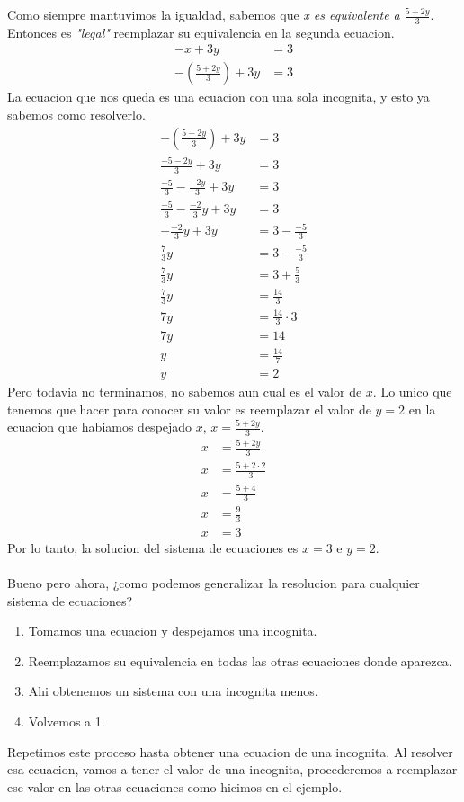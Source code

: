 \documentclass{article}
\begin{document}
\begin{normalsize}
Como siempre mantuvimos la igualdad, sabemos que \textit{x es equivalente a $\frac{5+2y}{3}$}. Entonces es \textit{"legal"} reemplazar su equivalencia en la segunda ecuacion.
	\begin{align}
	-x+3y&=3\nonumber\\
	-(\frac{5+2y}{3})+3y&=3\nonumber
	\end{align}
La ecuacion que nos queda es una ecuacion con una sola incognita, y esto ya sabemos como resolverlo.
	\begin{align}
	-(\frac{5+2y}{3})+3y&=3\nonumber\\
	\frac{-5-2y}{3}+3y&=3\nonumber\\
	\frac{-5}{3}-\frac{-2y}{3}+3y&=3\nonumber\\
	\frac{-5}{3}-\frac{-2}{3}y+3y&=3\nonumber\\
	-\frac{-2}{3}y+3y&=3-\frac{-5}{3}\nonumber\\
	\frac{7}{3}y&=3-\frac{-5}{3}\nonumber\\
	\frac{7}{3}y&=3+\frac{5}{3}\nonumber\\
	\frac{7}{3}y&=\frac{14}{3}\nonumber\\
	7y&=\frac{14}{3}\cdot3\nonumber\\
	7y&=14\nonumber\\
	y&=\frac{14}{7}\nonumber\\
	y&=2\nonumber
	\end{align}
Pero todavia no terminamos, no sabemos aun cual es el valor de $x$. Lo unico que tenemos que hacer para conocer su valor es reemplazar el valor de $y=2$ en la ecuacion que habiamos despejado $x$, $x=\frac{5+2y}{3}$.
	\begin{align}
	x&=\frac{5+2y}{3}\nonumber\\
	x&=\frac{5+2\cdot2}{3}\nonumber\\
	x&=\frac{5+4}{3}\nonumber\\
	x&=\frac{9}{3}\nonumber\\
	x&=3\nonumber
	\end{align}
Por lo tanto, la solucion del sistema de ecuaciones es $x=3$ e $y=2$.
\\ \\
Bueno pero ahora, ¿como podemos generalizar la resolucion para cualquier sistema de ecuaciones?

\begin{enumerate}
	\item Tomamos una ecuacion y despejamos una incognita.
	\item Reemplazamos su equivalencia en todas las otras ecuaciones donde aparezca.
	\item Ahi obtenemos un sistema con una incognita menos.
	\item Volvemos a 1.
\end{enumerate}

Repetimos este proceso hasta obtener una ecuacion de una incognita. Al resolver esa ecuacion, vamos a tener el valor de una incognita, procederemos a reemplazar ese valor en las otras ecuaciones como hicimos en el ejemplo.
\end{normalsize}
\end{document}
